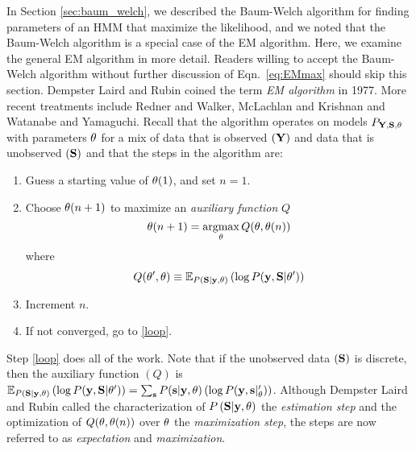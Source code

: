 In Section \ref{sec:baum_welch}, we described the Baum-Welch algorithm
for finding parameters of an HMM that maximize the likelihood, and we
noted that the Baum-Welch algorithm is a special case of the EM
algorithm.  Here, we examine the general EM algorithm in more detail.
Readers willing to accept the Baum-Welch algorithm without further
discussion of Eqn.~\ref{eq:EMmax} should skip this section.  Dempster
Laird and Rubin\cite{Dempster77} coined the term \emph{EM algorithm}
in 1977.  More recent treatments include Redner and
Walker\cite{Redner84}, McLachlan and Krishnan\cite{McLachlan96} and
Watanabe and Yamaguchi\cite{Watanabe04}.  
%
Recall that the algorithm operates on models $P_{{\bf Y},{\bf S},\theta} $
with parameters $\theta$ for a mix of data that is observed
$({\bf Y})$ and data that is unobserved $({\bf S})$ and that the steps in the
algorithm are:
\begin{enumerate}
\item Guess a starting value of ${\theta}{(1)}$, and set $n=1$.
\item \label{loop} Choose ${\theta}{(n+1)}$ to maximize
  an \emph{auxiliary function} $Q$
  \begin{equation}
    \label{eq:EMmax2}
    {\theta}{(n+1)} = \operatorname*{argmax}_{\theta} Q(\theta,
    {\theta}{(n)})
  \end{equation}
  where
  \begin{equation}
    \label{eq:Qdef2}
    Q(\theta',\theta) \equiv \mathbb{E}_{P\left({\bf S}|\mathbf{y}, \theta \right)}
    \left( \log P(\mathbf{y},{\bf S}|\theta') \right)
  \end{equation}
\item Increment $n$.
\item If not converged, go to \ref{loop}.
\end{enumerate}
Step \ref{loop} does all of the work.  Note that if the unobserved
data $({\bf S})$ is discrete, then the auxiliary function $(Q)$ is
$\mathbb{E}_{P\left({\bf S}|\mathbf{y},\theta \right)} \left( \log
  P(\mathbf{y},{\bf S}|\theta') \right) = \sum_{\bf s} P({\bf s}|\mathbf{y},\theta) \left(
  \log P(\mathbf{y},{\bf s}|_\theta') \right)$.  Although Dempster Laird and
Rubin \cite{Dempster77} called the characterization of $P
\left({\bf S}|\mathbf{y},\theta \right)$ the \emph{estimation step} and the
optimization of $Q(\theta, {\theta}{(n)})$ over
$\theta$ the \emph{maximization step}, the steps are now referred
to as \emph{expectation} and \emph{maximization}.

